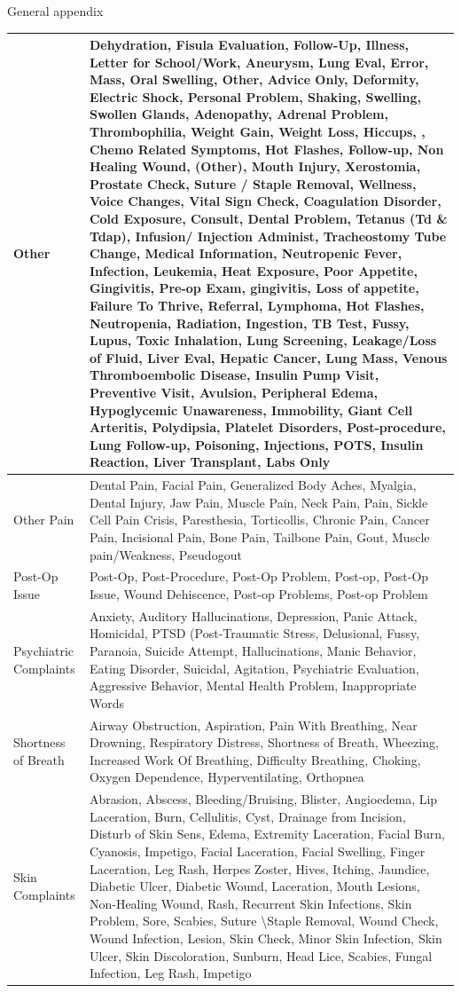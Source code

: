 \documentclass[,,nonblindrev]{informs}
\begin{document}
\begin{APPENDIX}{General appendix}
\begin{longtable}{|p{5cm}|p{12cm}|}
Other & Dehydration, Fisula Evaluation, Follow-Up, Illness, Letter for School/Work, Aneurysm, Lung Eval, Error, Mass, Oral Swelling, Other, Advice Only, Deformity, Electric Shock, Personal Problem, Shaking, Swelling, Swollen Glands, Adenopathy, Adrenal Problem, Thrombophilia, Weight Gain, Weight Loss, Hiccups, , Chemo Related Symptoms, Hot Flashes, Follow-up, Non Healing Wound, (Other), Mouth Injury, Xerostomia, Prostate Check, Suture / Staple Removal, Wellness, Voice Changes, Vital Sign Check, Coagulation Disorder, Cold Exposure, Consult, Dental Problem, Tetanus (Td \& Tdap), Infusion/ Injection Administ, Tracheostomy Tube Change, Medical Information, Neutropenic Fever, Infection, Leukemia, Heat Exposure, Poor Appetite, Gingivitis, Pre-op Exam, gingivitis, Loss of appetite, Failure To Thrive, Referral, Lymphoma, Hot Flashes, Neutropenia, Radiation, Ingestion, TB Test, Fussy, Lupus, Toxic Inhalation, Lung Screening, Leakage/Loss of Fluid, Liver Eval, Hepatic Cancer, Lung Mass, Venous Thromboembolic Disease, Insulin Pump Visit, Preventive Visit, Avulsion, Peripheral Edema, Hypoglycemic Unawareness, Immobility, Giant Cell Arteritis, Polydipsia, Platelet Disorders, Post-procedure, Lung Follow-up, Poisoning, Injections, POTS, Insulin Reaction, Liver Transplant, Labs Only \\
\hline
Other Pain & Dental Pain, Facial Pain, Generalized Body Aches, Myalgia, Dental Injury, Jaw Pain, Muscle Pain, Neck Pain, Pain, Sickle Cell Pain Crisis, Paresthesia, Torticollis, Chronic Pain, Cancer Pain, Incisional Pain, Bone Pain, Tailbone Pain, Gout, Muscle pain/Weakness, Pseudogout \\
\hline
Post-Op Issue & Post-Op, Post-Procedure, Post-Op Problem, Post-op, Post-Op Issue, Wound Dehiscence, Post-op Problems, Post-op Problem \\
\hline
Psychiatric Complaints & Anxiety, Auditory Hallucinations, Depression, Panic Attack, Homicidal, PTSD (Post-Traumatic Stress, Delusional, Fussy, Paranoia, Suicide Attempt, Hallucinations, Manic Behavior, Eating Disorder, Suicidal, Agitation, Psychiatric Evaluation, Aggressive Behavior, Mental Health Problem, Inappropriate Words \\
\hline
Shortness of Breath & Airway Obstruction, Aspiration, Pain With Breathing, Near Drowning, Respiratory Distress, Shortness of Breath, Wheezing, Increased Work Of Breathing, Difficulty Breathing, Choking, Oxygen Dependence, Hyperventilating, Orthopnea \\
\hline
Skin Complaints & Abrasion, Abscess, Bleeding/Bruising, Blister, Angioedema, Lip Laceration, Burn, Cellulitis, Cyst, Drainage from Incision, Disturb of Skin Sens, Edema, Extremity Laceration, Facial Burn, Cyanosis, Impetigo, Facial Laceration, Facial Swelling, Finger Laceration, Leg Rash, Herpes Zoster, Hives, Itching, Jaundice, Diabetic Ulcer, Diabetic Wound, Laceration, Mouth Lesions, Non-Healing Wound, Rash, Recurrent Skin Infections, Skin Problem, Sore, Scabies, Suture \textbackslash Staple Removal, Wound Check, Wound Infection, Lesion, Skin Check, Minor Skin Infection, Skin Ulcer, Skin Discoloration, Sunburn, Head Lice, Scabies, Fungal Infection, Leg Rash, Impetigo \\

\end{longtable}
\end{APPENDIX}
\end{document}
